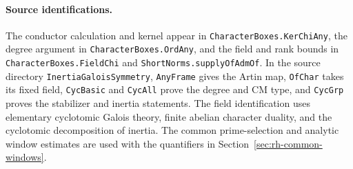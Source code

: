 \paragraph{Source identifications.}
The conductor calculation and kernel appear in
\texttt{CharacterBoxes.KerChiAny}, the degree argument in
\texttt{CharacterBoxes.OrdAny}, and the field and rank bounds in
\texttt{CharacterBoxes.FieldChi} and \texttt{ShortNorms.supplyOfAdmOf}.
In the source directory \texttt{InertiaGaloisSymmetry},
\texttt{AnyFrame} gives the Artin map, \texttt{OfChar} takes its fixed
field, \texttt{CycBasic} and \texttt{CycAll} prove the degree and CM type,
and \texttt{CycGrp} proves the stabilizer and inertia statements.
The field identification uses elementary cyclotomic Galois theory,
finite abelian character duality, and the cyclotomic decomposition of
inertia. The common prime-selection and analytic window estimates are
used with the quantifiers in Section~\ref{sec:rh-common-windows}.
